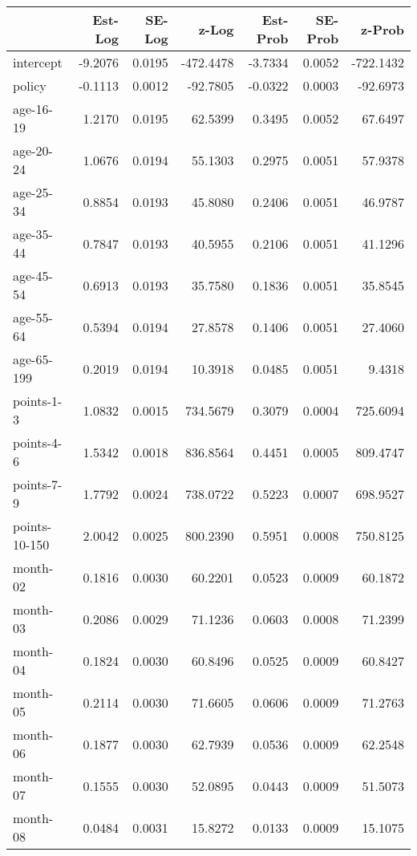 \documentclass[10pt]{article}
\begin{document}

\begin{table}[ht]
\centering
\begin{tabular}{lrrrrrr}
  \hline
 & Est-Log & SE-Log & z-Log & Est-Prob & SE-Prob & z-Prob \\ 
  \hline
intercept & -9.2076 & 0.0195 & -472.4478 & -3.7334 & 0.0052 & -722.1432 \\ 
  policy & -0.1113 & 0.0012 & -92.7805 & -0.0322 & 0.0003 & -92.6973 \\ 
  age-16-19 & 1.2170 & 0.0195 & 62.5399 & 0.3495 & 0.0052 & 67.6497 \\ 
  age-20-24 & 1.0676 & 0.0194 & 55.1303 & 0.2975 & 0.0051 & 57.9378 \\ 
  age-25-34 & 0.8854 & 0.0193 & 45.8080 & 0.2406 & 0.0051 & 46.9787 \\ 
  age-35-44 & 0.7847 & 0.0193 & 40.5955 & 0.2106 & 0.0051 & 41.1296 \\ 
  age-45-54 & 0.6913 & 0.0193 & 35.7580 & 0.1836 & 0.0051 & 35.8545 \\ 
  age-55-64 & 0.5394 & 0.0194 & 27.8578 & 0.1406 & 0.0051 & 27.4060 \\ 
  age-65-199 & 0.2019 & 0.0194 & 10.3918 & 0.0485 & 0.0051 & 9.4318 \\ 
  points-1-3 & 1.0832 & 0.0015 & 734.5679 & 0.3079 & 0.0004 & 725.6094 \\ 
  points-4-6 & 1.5342 & 0.0018 & 836.8564 & 0.4451 & 0.0005 & 809.4747 \\ 
  points-7-9 & 1.7792 & 0.0024 & 738.0722 & 0.5223 & 0.0007 & 698.9527 \\ 
  points-10-150 & 2.0042 & 0.0025 & 800.2390 & 0.5951 & 0.0008 & 750.8125 \\ 
  month-02 & 0.1816 & 0.0030 & 60.2201 & 0.0523 & 0.0009 & 60.1872 \\ 
  month-03 & 0.2086 & 0.0029 & 71.1236 & 0.0603 & 0.0008 & 71.2399 \\ 
  month-04 & 0.1824 & 0.0030 & 60.8496 & 0.0525 & 0.0009 & 60.8427 \\ 
  month-05 & 0.2114 & 0.0030 & 71.6605 & 0.0606 & 0.0009 & 71.2763 \\ 
  month-06 & 0.1877 & 0.0030 & 62.7939 & 0.0536 & 0.0009 & 62.2548 \\ 
  month-07 & 0.1555 & 0.0030 & 52.0895 & 0.0443 & 0.0009 & 51.5073 \\ 
  month-08 & 0.0484 & 0.0031 & 15.8272 & 0.0133 & 0.0009 & 15.1075 \\ 

\end{tabular}
\end{table}
\end{document}

